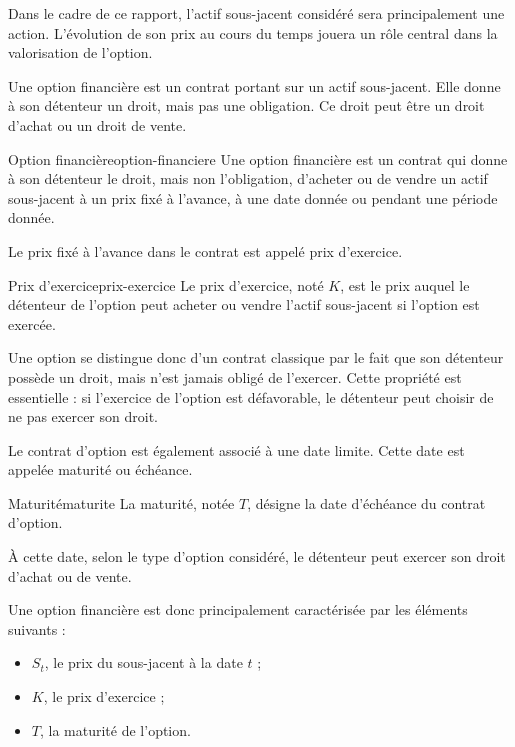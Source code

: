 \documentclass[12pt,a4paper]{report}
\begin{document}
Dans le cadre de ce rapport, l'actif sous-jacent considéré sera principalement une action. L'évolution de son prix au cours du temps jouera un rôle central dans la valorisation de l'option.

Une option financière est un contrat portant sur un actif sous-jacent. Elle donne à son détenteur un droit, mais pas une obligation. Ce droit peut être un droit d'achat ou un droit de vente.

\begin{definition}{Option financière}{option-financiere}
Une option financière est un contrat qui donne à son détenteur le droit, mais non l'obligation, d'acheter ou de vendre un actif sous-jacent à un prix fixé à l'avance, à une date donnée ou pendant une période donnée.
\end{definition}

Le prix fixé à l'avance dans le contrat est appelé prix d'exercice.

\begin{definition}{Prix d'exercice}{prix-exercice}
Le prix d'exercice, noté $K$, est le prix auquel le détenteur de l'option peut acheter ou vendre l'actif sous-jacent si l'option est exercée.
\end{definition}

Une option se distingue donc d'un contrat classique par le fait que son détenteur possède un droit, mais n'est jamais obligé de l'exercer. Cette propriété est essentielle : si l'exercice de l'option est défavorable, le détenteur peut choisir de ne pas exercer son droit.

Le contrat d'option est également associé à une date limite. Cette date est appelée maturité ou échéance.

\begin{definition}{Maturité}{maturite}
La maturité, notée $T$, désigne la date d'échéance du contrat d'option.

À cette date, selon le type d'option considéré, le détenteur peut exercer son droit d'achat ou de vente.
\end{definition}

Une option financière est donc principalement caractérisée par les éléments suivants :
\begin{itemize}
   \item $S_t$, le prix du sous-jacent à la date $t$ ;
   \item $K$, le prix d'exercice ;
   \item $T$, la maturité de l'option.
\end{itemize}
\end{document}
